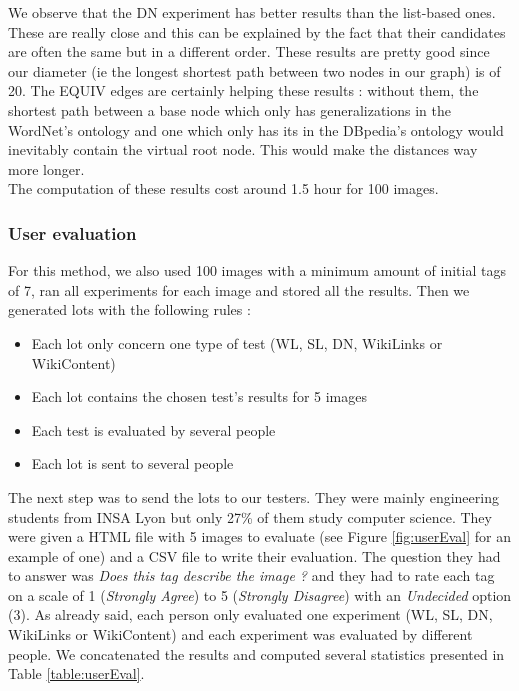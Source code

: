 We observe that the DN experiment has better results than the list-based ones. These are really close and this can be explained by the fact that their candidates are often the same but in a different order. These results are pretty good since our diameter (ie the longest shortest path between two nodes in our graph) is of 20. The EQUIV edges are certainly helping these results : without them, the shortest path between a base node which only has generalizations in the WordNet's ontology and one which only has its in the DBpedia's ontology would inevitably contain the virtual root node. This would make the distances way more longer.\\

The computation of these results cost around 1.5 hour for 100 images.
\subsubsection{User evaluation} %
\label{ssub:user_evaluation}
For this method, we also used 100 images with a minimum amount of initial tags of 7, ran all experiments for each image and stored all the results. Then we generated lots with the following rules :
\begin{itemize}
  \item Each lot only concern one type of test (WL, SL, DN, WikiLinks or WikiContent)
  \item Each lot contains the chosen test's results for 5 images
  \item Each test is evaluated by several people
  \item Each lot is sent to several people
\end{itemize}

The next step was to send the lots to our testers. They were mainly engineering students from INSA Lyon but only 27\% of them study computer science. They were given a HTML file with 5 images to evaluate (see Figure \ref{fig:userEval} for an example of one) and a CSV file to write their evaluation. The question they had to answer was \emph{Does this tag describe the image ?} and they had to rate each tag on a scale of 1 (\emph{Strongly Agree}) to 5 (\emph{Strongly Disagree}) with an \emph{Undecided} option (3). As already said, each person only evaluated one experiment (WL, SL, DN, WikiLinks or WikiContent) and each experiment was evaluated by different people. We concatenated the results and computed several statistics presented in Table \ref{table:userEval}.\\

